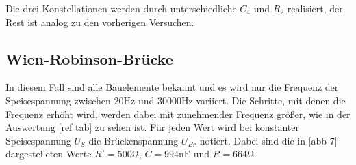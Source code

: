 Die drei Konstellationen werden durch unterschiedliche $C_4$ und $R_2$ realisiert, der Rest ist 
analog zu den vorherigen Versuchen.

\subsection{Wien-Robinson-Brücke}

In diesem Fall sind alle Bauelemente bekannt und es wird nur die Frequenz der Speisespannung
zwischen 20\si{\hertz} und 30000\si{\hertz} variiert. Die Schritte, mit denen die Frequenz erhöht
wird, werden dabei mit zunehmender Frequenz größer, wie in der Auswertung [ref tab] zu sehen ist.
Für jeden Wert wird bei konstanter Speisespannung $U_S$ die Brückenspannung $U_{Br}$ notiert. 
Dabei sind die in [abb 7] dargestelleten Werte $R'=500\si{\ohm}$, $C=994\si{\nano\farad}$ und $R=664\si{\ohm}$.



